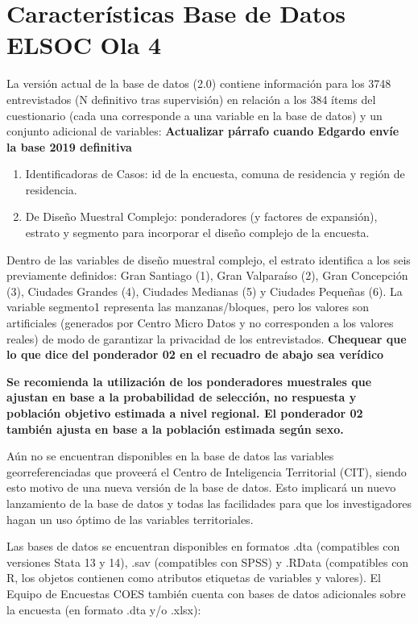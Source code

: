 \documentclass[
]{book}
\begin{document}
\hypertarget{caracteruxedsticas-base-de-datos-elsoc-ola-4}{%
\section{Características Base de Datos ELSOC Ola 4}\label{caracteruxedsticas-base-de-datos-elsoc-ola-4}}

La versión actual de la base de datos (2.0) contiene información para los 3748 entrevistados (N definitivo tras supervisión) en relación a los 384 ítems del cuestionario (cada una corresponde a una variable en la base de datos) y un conjunto adicional de variables: \textbf{Actualizar párrafo cuando Edgardo envíe la base 2019 definitiva}

\begin{enumerate}
\def\labelenumi{\arabic{enumi}.}
\item
  Identificadoras de Casos: id de la encuesta, comuna de residencia y región de residencia.
\item
  De Diseño Muestral Complejo: ponderadores (y factores de expansión), estrato y segmento para incorporar el diseño complejo de la encuesta.
\end{enumerate}

Dentro de las variables de diseño muestral complejo, el estrato identifica a los seis previamente definidos: Gran Santiago (1), Gran Valparaíso (2), Gran Concepción (3), Ciudades Grandes (4), Ciudades Medianas (5) y Ciudades Pequeñas (6). La variable segmento1 representa las manzanas/bloques, pero los valores son artificiales (generados por Centro Micro Datos y no corresponden a los valores reales) de modo de garantizar la privacidad de los entrevistados. \textbf{Chequear que lo que dice del ponderador 02 en el recuadro de abajo sea verídico}

\textbf{Se recomienda la utilización de los ponderadores muestrales que ajustan en base a la probabilidad de selección, no respuesta y población objetivo estimada a nivel regional. El ponderador 02 también ajusta en base a la población estimada según sexo.}

Aún no se encuentran disponibles en la base de datos las variables georreferenciadas que proveerá el Centro de Inteligencia Territorial (CIT), siendo esto motivo de una nueva versión de la base de datos. Esto implicará un nuevo lanzamiento de la base de datos y todas las facilidades para que los investigadores hagan un uso óptimo de las variables territoriales.

Las bases de datos se encuentran disponibles en formatos .dta (compatibles con versiones Stata 13 y 14), .sav (compatibles con SPSS) y .RData (compatibles con R, los objetos contienen como atributos etiquetas de variables y valores). El Equipo de Encuestas COES también cuenta con bases de datos adicionales sobre la encuesta (en formato .dta y/o .xlsx):
\end{document}
